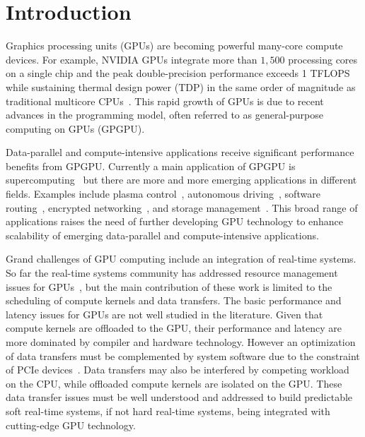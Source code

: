 \section{Introduction}
\label{sec:introduction}

Graphics processing units (GPUs) are becoming powerful many-core compute
devices.
For example, NVIDIA GPUs integrate more than $1,500$ processing cores on
a single chip and the peak double-precision performance exceeds 1
TFLOPS while sustaining thermal design power (TDP) in the same order of
magnitude as traditional multicore CPUs~\cite{NVIDIA_Kepler}. 
This rapid growth of GPUs is due to recent advances in the
programming model, often referred to as general-purpose computing on
GPUs (GPGPU).

Data-parallel and compute-intensive applications receive significant
performance benefits from GPGPU.
Currently a main application of GPGPU is supercomputing~\cite{TOP500}
but there are more and more emerging applications in different fields.
Examples include plasma control~\cite{Kato_ICCPS13}, autonomous
driving~\cite{McNaughton_ICRA11}, software routing~\cite{Han_SIGCOMM10},
encrypted networking~\cite{Jang_NSDI11}, and storage
management~\cite{Bhatotia_FAST12, Gharaibeh_HPDC10, Kato_ATC12,
Sun_SYSTOR12}.
This broad range of applications raises the need of further developing
GPU technology to enhance scalability of emerging data-parallel and
compute-intensive applications.

Grand challenges of GPU computing include an integration of real-time
systems.
So far the real-time systems community has addressed resource management
issues for GPUs~\cite{Basaran_ECRTS12, Elliott_RTS12, Elliott_ECRTS12,
Kato_ATC11, Kato_RTAS11, Kato_RTSS11}, but the main contribution of
these work is limited to the scheduling of compute kernels and data
transfers.
The basic performance and latency issues for GPUs are not well studied
in the literature.
Given that compute kernels are offloaded to the GPU, their performance
and latency are more dominated by compiler and hardware technology.
However an optimization of data transfers must be complemented by system
software due to the constraint of PCIe devices~\cite{Kato_ATC12}.
Data transfers may also be interfered by competing workload on the CPU,
while offloaded compute kernels are isolated on the GPU.
These data transfer issues must be well understood and addressed to
build predictable soft real-time systems, if not hard real-time systems,
being integrated with cutting-edge GPU technology.


